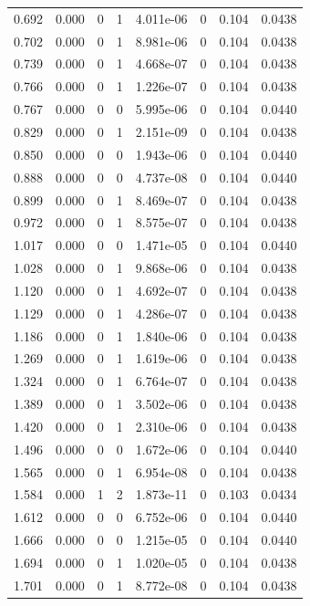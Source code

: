 \documentclass[preview]{standalone}
\begin{document}
{{\begin{tabular}{L{1.2cm}C{1.2cm} C{0.3cm}C{0.5cm} C{1.4cm}C{1.4cm} C{1.4cm}C{1.4cm}}
  0.692  &  0.000  & 0     &  1 &  4.011e-06  & 0  & 0.104 &  0.0438   \\ 
  0.702  &  0.000  & 0     &  1 &  8.981e-06  & 0  & 0.104 &  0.0438   \\ 
  0.739  &  0.000  & 0     &  1 &  4.668e-07  & 0  & 0.104 &  0.0438   \\ 
  0.766  &  0.000  & 0     &  1 &  1.226e-07  & 0  & 0.104 &  0.0438   \\ 
  0.767  &  0.000  & 0     &  0 &  5.995e-06  & 0  & 0.104 &  0.0440   \\ 
  0.829  &  0.000  & 0     &  1 &  2.151e-09  & 0  & 0.104 &  0.0438   \\ 
  0.850  &  0.000  & 0     &  0 &  1.943e-06  & 0  & 0.104 &  0.0440   \\ 
  0.888  &  0.000  & 0     &  0 &  4.737e-08  & 0  & 0.104 &  0.0440   \\ 
  0.899  &  0.000  & 0     &  1 &  8.469e-07  & 0  & 0.104 &  0.0438   \\ 
  0.972  &  0.000  & 0     &  1 &  8.575e-07  & 0  & 0.104 &  0.0438   \\ 
  1.017  &  0.000  & 0     &  0 &  1.471e-05  & 0  & 0.104 &  0.0440   \\ 
  1.028  &  0.000  & 0     &  1 &  9.868e-06  & 0  & 0.104 &  0.0438   \\ 
  1.120  &  0.000  & 0     &  1 &  4.692e-07  & 0  & 0.104 &  0.0438   \\ 
  1.129  &  0.000  & 0     &  1 &  4.286e-07  & 0  & 0.104 &  0.0438   \\ 
  1.186  &  0.000  & 0     &  1 &  1.840e-06  & 0  & 0.104 &  0.0438   \\ 
  1.269  &  0.000  & 0     &  1 &  1.619e-06  & 0  & 0.104 &  0.0438   \\ 
  1.324  &  0.000  & 0     &  1 &  6.764e-07  & 0  & 0.104 &  0.0438   \\ 
  1.389  &  0.000  & 0     &  1 &  3.502e-06  & 0  & 0.104 &  0.0438   \\ 
  1.420  &  0.000  & 0     &  1 &  2.310e-06  & 0  & 0.104 &  0.0438   \\ 
  1.496  &  0.000  & 0     &  0 &  1.672e-06  & 0  & 0.104 &  0.0440   \\ 
  1.565  &  0.000  & 0     &  1 &  6.954e-08  & 0  & 0.104 &  0.0438   \\ 
  1.584  &  0.000  & 1     &  2 &  1.873e-11  & 0  & 0.103 &  0.0434   \\ 
  1.612  &  0.000  & 0     &  0 &  6.752e-06  & 0  & 0.104 &  0.0440   \\ 
  1.666  &  0.000  & 0     &  0 &  1.215e-05  & 0  & 0.104 &  0.0440   \\ 
  1.694  &  0.000  & 0     &  1 &  1.020e-05  & 0  & 0.104 &  0.0438   \\ 
  1.701  &  0.000  & 0     &  1 &  8.772e-08  & 0  & 0.104 &  0.0438   \\ 
\hline 
\end{tabular} 

}}
\end{document}
